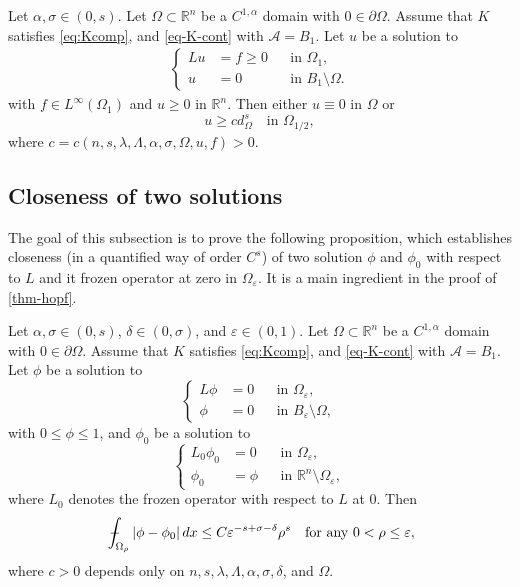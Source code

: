 \documentclass[11pt,reqno]{amsart}
\theoremstyle{plain}
\theoremstyle{definition}
\numberwithin{equation}{section}
\newcommand{\R}{\mathbb{R}}
\newcommand{\eps}{\varepsilon}
\newcommand{\1}{\mathbbm{1}}
\renewcommand{\d}{\textnormal{\,d}}
\newcommand{\average}{{\mathchoice {\kern1ex\vcenter{\hrule height.4pt
width 6pt depth0pt} \kern-9.7pt} {\kern1ex\vcenter{\hrule
height.4pt width 4.3pt depth0pt} \kern-7pt} {} {} }}
\newcommand{\dashint}{\average\int}
\begin{document}
\begin{theorem}\label{thm-hopf}
Let $\alpha, \sigma \in (0,s)$. Let $\Omega \subset \R^n$ be a $C^{1,\alpha}$ domain with $0 \in \partial \Omega$. Assume that $K$ satisfies \eqref{eq:Kcomp}, and \eqref{eq-K-cont} with $\mathcal{A} = B_1$. Let $u$ be a solution to
\begin{align*}
\left\{
\begin{aligned}
Lu& = f \ge 0 &&\text{in }\Omega_1, \\
u&= 0 &&\text{in }B_1 \setminus \Omega.
\end{aligned}
\right.
\end{align*}
with $f \in L^{\infty}(\Omega_1)$ and $u \ge 0$ in $\R^n$.
Then either $u \equiv 0$ in $\Omega$ or
\begin{equation*}
u \geq c d_\Omega^s \quad \text{in } \Omega_{1/2},
\end{equation*}
where $c=c(n, s, \lambda, \Lambda, \alpha, \sigma, \Omega, u, f)>0$.
\end{theorem}


\subsection{Closeness of two solutions}

The goal of this subsection is to prove the following proposition, which establishes closeness (in a quantified way of order $C^s$) of two solution $\phi$ and $\phi_0$ with respect to $L$ and it frozen operator at zero in $\Omega_{\eps}$. It is a main ingredient in the proof of \autoref{thm-hopf}.

\begin{proposition}
\label{prop:closeness-phi}
Let $\alpha, \sigma \in (0,s)$, $\delta \in (0, \sigma)$, and $\varepsilon \in (0, 1)$. Let $\Omega \subset \R^n$ be a $C^{1,\alpha}$ domain with $0 \in \partial \Omega$.
Assume that $K$ satisfies \eqref{eq:Kcomp}, and \eqref{eq-K-cont} with $\mathcal{A} = B_1$. Let $\phi$ be a solution to  
\begin{equation*}
\left\{
\begin{aligned}
L\phi&=0 &&\text{in }\Omega_{\eps}, \\
\phi&=0 &&\text{in } B_{\eps} \setminus \Omega,
\end{aligned}
\right.
\end{equation*}
with $0 \le \phi \le 1$, and $\phi_0$ be a solution to
\begin{equation*}
\left\{
\begin{aligned}
L_0 \phi_0 & = 0 &&\text{in }\Omega_{\eps}, \\
\phi_0 & = \phi &&\text{in } \R^n \setminus \Omega_{\eps},
\end{aligned}
\right.
\end{equation*}
where $L_0$ denotes the frozen operator with respect to $L$ at $0$. Then
    \begin{align*}
    \dashint_{\Omega_{\rho}} |\phi - \phi_0| \d x \le C \eps^{-s + \sigma-\delta}\rho^s \quad\text{for any }0<\rho\leq \varepsilon,
    \end{align*}
where $c>0$ depends only on $n,s,\lambda,\Lambda,\alpha,\sigma,\delta$, and $\Omega$.
\end{proposition}
\end{document}
